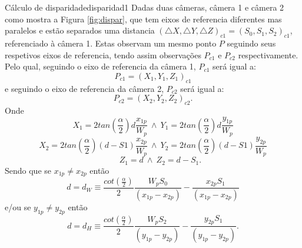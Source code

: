 \documentclass[a4paper,10pt]{article}
\begin{document}
\begin{theoremtcolorbox}{Cálculo de disparidade}{disparidad1}
Dadas duas câmeras, câmera 1 e câmera 2 como mostra a Figura \ref{fig:dispar}, que tem
eixos de referencia diferentes mas paralelos e estão separados uma distancia 
$(\bigtriangleup X, \bigtriangleup Y,\bigtriangleup Z)_{c1}=(S_0, S_1, S_2)_{c1}$,
referenciado à câmera 1.
Estas observam um mesmo ponto $P$ seguindo seus respetivos eixos de referencia, 
tendo assim observações $P_{c1}$ e $P_{c2}$ respectivamente.
Pelo qual, seguindo o eixo de referencia da câmera 1, $P_{c1}$ será igual a:
\begin{equation}\label{eq:Pc1}
P_{c1}=(X_1,Y_1,Z_1)_{c1}
\end{equation}
e seguindo o eixo de referencia da câmera 2, $P_{c2}$ será igual a:
\begin{equation}\label{eq:Pc2}
P_{c2}=(X_2,Y_2,Z_2)_{c2}.
\end{equation}
Onde
\begin{equation}\label{eq:res2}
 X_1=2 tan(\frac{\alpha}{2})d\frac{x_{1p}}{W_p}~\wedge~Y_1=2 tan(\frac{\alpha}{2})d\frac{y_{1p}}{W_p}
\end{equation}
\begin{equation}\label{eq:res3}
 X_2=2 tan(\frac{\alpha}{2})(d-S1)\frac{x_{2p}}{W_p}~\wedge~Y_2=2 tan(\frac{\alpha}{2})(d-S1)\frac{y_{2p}}{W_p}
\end{equation}
\begin{equation}\label{eq:res4}
 ~~~~~~~~Z_1=d~\wedge~Z_2=d-S_1.
\end{equation}
Sendo que se $x_{1p}\neq x_{2p}$ então
\begin{equation}\label{eq:res1}
 d=d_W \equiv \frac{cot(\frac{\alpha}{2})}{2} \frac{W_p S_0}{(x_{1p}-x_{2p})}-\frac{x_{2p} S_1}{(x_{1p}-x_{2p})}
\end{equation}
e/ou se $y_{1p}\neq y_{2p}$ então
\begin{equation}\label{eq:res1a}
 d= d_H \equiv \frac{cot(\frac{\alpha}{2})}{2} \frac{W_p S_2}{(y_{1p}-y_{2p})}-\frac{y_{2p} S_1}{(y_{1p}-y_{2p})}.
\end{equation}
\end{theoremtcolorbox}
\end{document}
